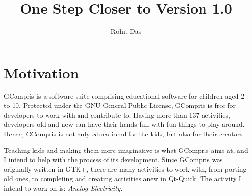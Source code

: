 \documentclass[preprint,12pt]{elsarticle}
\begin{document}
\begin{frontmatter}



\title{One Step Closer to Version 1.0}


\author{Rohit Das}

\address{ \textbf{Email ID}: rohit.das950@gmail.com}
\address{ \textbf{Freenode IRC Nick}: mouri11}
\address{ \textbf{Location}: Serampore, West Bengal, India UTC+5:30}

\end{frontmatter}


\section{Motivation}
\label{S:1}

{GCompris is a software suite comprising educational software for children aged 2 to 10. Protected under the GNU General Public License, GCompris is free for developers to work with and contribute to. Having more than 137 activities, developers old and new can have their hands full with fun things to play around. Hence, GCompris is not only educational for the kids, but also for their creators.}

{Teaching kids and making them more imaginative is what GCompris aims at, and I intend to help with the process of its development. Since GCompris was originally written in GTK+, there are many activities to work with, from porting old ones, to completing and creating activities anew in Qt-Quick. The activity I intend to work on is: \textit{Analog Electricity}.}
\end{document}
